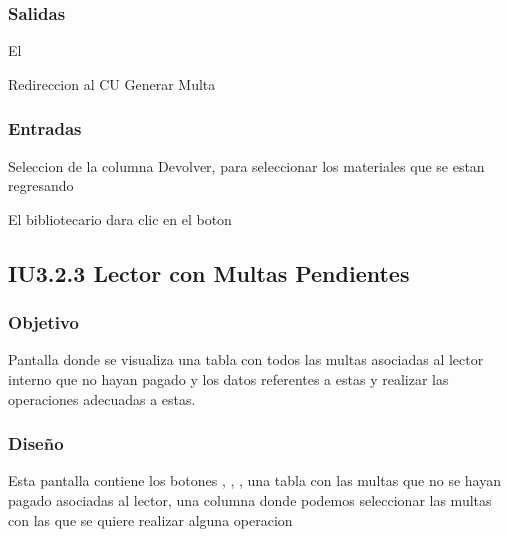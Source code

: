 
\subsubsection{Salidas}
	\begin{Citemize}
		\item El 
		\item Redireccion al CU Generar Multa
	\end{Citemize}
	
\subsubsection{Entradas}
	\begin{Citemize}
		\item Seleccion de la columna Devolver, para seleccionar los materiales que se estan regresando
		\item El bibliotecario dara clic en el boton \IUbutton{Generar Multa}
	\end{Citemize}

\newpage
\subsection{IU3.2.3 Lector con Multas Pendientes}

\subsubsection{Objetivo}
	Pantalla donde se visualiza una tabla con todos las multas asociadas al lector interno que no hayan pagado y los datos referentes a estas y realizar las operaciones adecuadas a estas.

\subsubsection{Diseño}
	Esta pantalla contiene los botones , , , una tabla con las multas que no se hayan pagado asociadas al lector, una columna donde podemos seleccionar las multas con las que se quiere realizar alguna operacion \\\\


